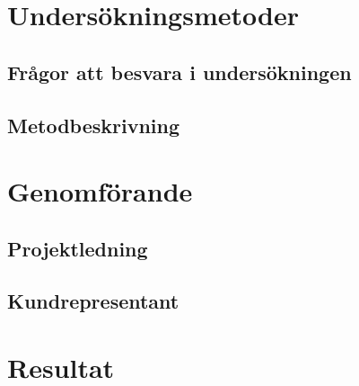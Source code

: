 \documentclass[conference]{IEEEtran}
\begin{document}


\section*{Undersökningsmetoder}

\subsection{Frågor att besvara i undersökningen}

\subsection{Metodbeskrivning}

\section{Genomförande}

\subsection{Projektledning}

\subsection{Kundrepresentant}

\section{Resultat}

%
\end{document}
